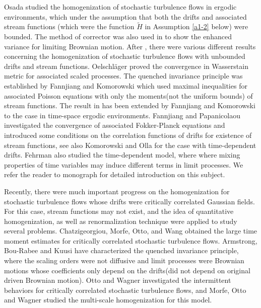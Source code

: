 \documentclass[11pt,draft, reqno]{amsart}
\theoremstyle{definition}
\numberwithin{equation}{section}
\begin{document}
Osada \cite{O} studied the homogenization of stochastic turbulence flows in ergodic environments, which 
under the assumption that both the drifts and associated stream functions
(which were the function $\tilde H$ in Assumption \ref{a1-2} below) were bounded. The method of corrector was also used
in \cite{O} to show the enhanced variance for limiting Brownian motion.
After \cite{O}, there were various
different results concerning the homogenization of stochastic turbulence flows with unbounded drifts and stream functions.
Oelschl\"ager \cite{Oe} proved
the convergence in Wasserstain metric for associated scaled processes. The quenched invariance principle
was established by Fannjiang and Komorowski \cite{FK} which used maximal inequalities for
associated Poisson equations with only the moments(not the uniform bounds) of stream functions.
The result in \cite{FK} has been extended by Fannjiang and Komorowski \cite{FK1} to the case in time-space ergodic environments.
Fannjiang and Papanicolaou \cite{FP} investigated the convergence of associated Fokker-Planck equations and introduced
some conditions on the correlation functions of drifts for existence of stream functions, see also Komorowski and Olla \cite{KO}
for the case with time-dependent drifts. Fehrman \cite{Fe} also studied the time-dependent model, where
where
mixing properties of time variables may induce different terms in limit processes. We refer the reader to monograph
\cite{KLO} for detailed introduction on this subject.


Recently, there were much important progress on the homogenization for stochastic turbulence flows
whose drifts were critically correlated Gaussian fields. For this case, stream functions may not exist, and
the idea of quantitative homogenization, as well as renormalization technique were applied
to study several problems. Chatzigeorgiou, Morfe, Otto, and Wang \cite{CMOW} obtained
the large time moment estimates for critically correlated stochastic turbulence flows.
Armstrong, Bou-Rabee and Kuusi \cite{ABK} have characterized the quenched invariance principle, where
the scaling orders were not diffusive and limit processes were Brownian motions whose coefficients
only depend on the drifts(did not depend on original driven Brownian motion). Otto and Wagner \cite{OW}
investigated the intermittent behaviors for critically correlated stochastic turbulence flows,
and Morfe, Otto and Wagner \cite{MOW} studied the multi-scale homogenization for this model.
\end{document}
